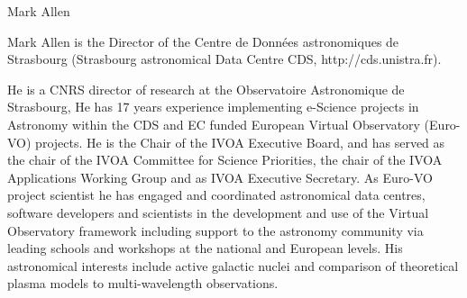 \begin{participant}[type=leadPI,PM=0,gender=male]{Mark Allen}




  \par Mark Allen is the Director of the Centre de Données astronomiques de 
       Strasbourg (Strasbourg astronomical Data Centre CDS, 
       http://cds.unistra.fr).
    
  \par He is a CNRS director of research at the Observatoire Astronomique de
       Strasbourg,  He has 17 years experience implementing e-Science projects
       in Astronomy within the CDS and EC funded European Virtual Observatory
       (Euro- VO) projects. He is the Chair of the IVOA Executive Board, and 
       has served as the chair of the IVOA Committee for Science Priorities, 
       the chair of the IVOA  Applications Working Group and as IVOA Executive 
       Secretary. As Euro-VO project scientist he has engaged and coordinated 
       astronomical data centres, software developers and scientists in the 
       development and use of the Virtual Observatory framework including 
       support to the astronomy community via leading schools and workshops at 
       the national and European levels. His astronomical interests include 
       active galactic nuclei and comparison of theoretical plasma models to 
       multi-wavelength observations.




\end{participant}

